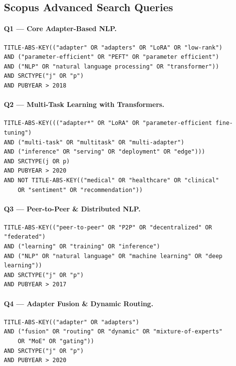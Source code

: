 \subsection*{Scopus Advanced Search Queries}
\label{app:db_queries:scopus}

\paragraph{Q1 — Core Adapter-Based NLP.}
\begin{verbatim}
TITLE-ABS-KEY(("adapter" OR "adapters" OR "LoRA" OR "low-rank")
AND ("parameter-efficient" OR "PEFT" OR "parameter efficient")
AND ("NLP" OR "natural language processing" OR "transformer"))
AND SRCTYPE("j" OR "p")
AND PUBYEAR > 2018
\end{verbatim}

\paragraph{Q2 — Multi-Task Learning with Transformers.}
\begin{verbatim}
TITLE-ABS-KEY((("adapter*" OR "LoRA" OR "parameter-efficient fine-tuning")
AND ("multi-task" OR "multitask" OR "multi-adapter")
AND ("inference" OR "serving" OR "deployment" OR "edge")))
AND SRCTYPE(j OR p)
AND PUBYEAR > 2020
AND NOT TITLE-ABS-KEY(("medical" OR "healthcare" OR "clinical"
    OR "sentiment" OR "recommendation"))
\end{verbatim}

\paragraph{Q3 — Peer-to-Peer \& Distributed NLP.}
\begin{verbatim}
TITLE-ABS-KEY(("peer-to-peer" OR "P2P" OR "decentralized" OR "federated")
AND ("learning" OR "training" OR "inference")
AND ("NLP" OR "natural language" OR "machine learning" OR "deep learning"))
AND SRCTYPE("j" OR "p")
AND PUBYEAR > 2017
\end{verbatim}

\paragraph{Q4 — Adapter Fusion \& Dynamic Routing.}
\begin{verbatim}
TITLE-ABS-KEY(("adapter" OR "adapters")
AND ("fusion" OR "routing" OR "dynamic" OR "mixture-of-experts"
    OR "MoE" OR "gating"))
AND SRCTYPE("j" OR "p")
AND PUBYEAR > 2020
\end{verbatim}

